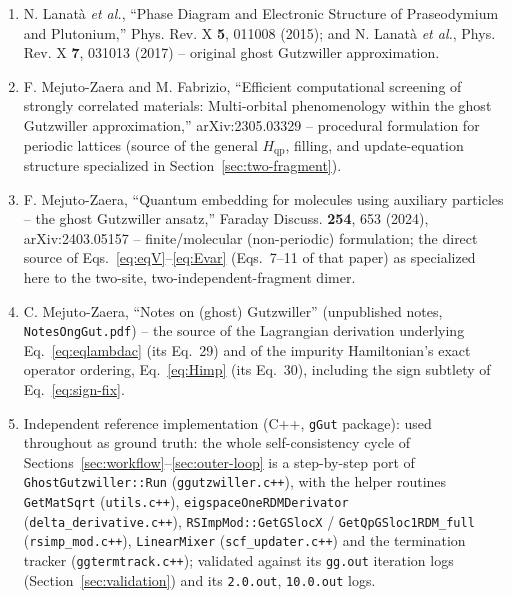 \documentclass[11pt]{article}
\newcommand{\Hqp}{H_{\mathrm{qp}}}
\begin{document}
\begin{enumerate}
  \item N. Lanat\`a \emph{et al.}, ``Phase Diagram and Electronic Structure
    of Praseodymium and Plutonium,'' Phys. Rev. X \textbf{5}, 011008 (2015);
    and N. Lanat\`a \emph{et al.}, Phys. Rev. X \textbf{7}, 031013 (2017) --
    original ghost Gutzwiller approximation.
  \item F. Mejuto-Zaera and M. Fabrizio, ``Efficient computational screening
    of strongly correlated materials: Multi-orbital phenomenology within the
    ghost Gutzwiller approximation,'' arXiv:2305.03329 -- procedural
    formulation for periodic lattices (source of the general $\Hqp$,
    filling, and update-equation structure specialized in
    Section~\ref{sec:two-fragment}).
  \item F. Mejuto-Zaera, ``Quantum embedding for molecules using auxiliary
    particles -- the ghost Gutzwiller ansatz,'' Faraday Discuss. \textbf{254},
    653 (2024), arXiv:2403.05157 -- finite/molecular (non-periodic)
    formulation; the direct source of Eqs.~\eqref{eq:eqV}--\eqref{eq:Evar}
    (Eqs.~7--11 of that paper) as specialized here to the two-site,
    two-independent-fragment dimer.
  \item C. Mejuto-Zaera, ``Notes on (ghost) Gutzwiller'' (unpublished notes,
    \texttt{NotesOngGut.pdf}) -- the source of the Lagrangian derivation
    underlying Eq.~\eqref{eq:eqlambdac} (its Eq.~29) and of the impurity
    Hamiltonian's exact operator ordering, Eq.~\eqref{eq:Himp} (its Eq.~30),
    including the sign subtlety of Eq.~\eqref{eq:sign-fix}.
  \item Independent reference implementation (C++, \texttt{gGut} package):
    used throughout as ground truth: the whole self-consistency cycle of
    Sections~\ref{sec:workflow}--\ref{sec:outer-loop} is a step-by-step
    port of \texttt{GhostGutzwiller::Run} (\texttt{ggutzwiller.c++}), with the
    helper routines \texttt{GetMatSqrt} (\texttt{utils.c++}),
    \texttt{eigspaceOneRDMDerivator} (\texttt{delta\_derivative.c++}),
    \texttt{RSImpMod::GetGSlocX} / \texttt{GetQpGSloc1RDM\_full}
    (\texttt{rsimp\_mod.c++}), \texttt{LinearMixer} (\texttt{scf\_updater.c++})
    and the termination tracker (\texttt{ggtermtrack.c++}); validated against
    its \texttt{gg.out} iteration logs (Section~\ref{sec:validation}) and its
    \texttt{2.0.out}, \texttt{10.0.out} logs.
\end{enumerate}
\end{document}
